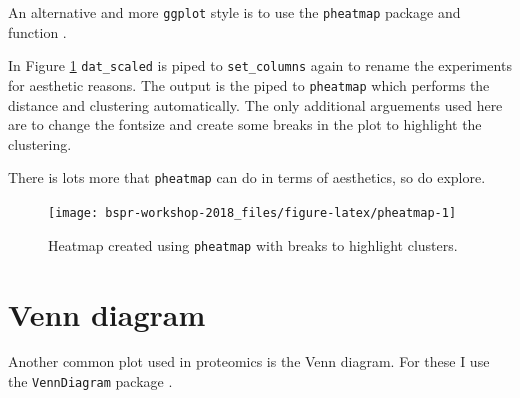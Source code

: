 \documentclass[12pt,]{book}
\newenvironment{Shaded}{\begin{snugshade}}{\end{snugshade}}
\newcommand{\CommentTok}[1]{\textcolor[rgb]{0.56,0.35,0.01}{\textit{#1}}}
\newcommand{\DataTypeTok}[1]{\textcolor[rgb]{0.13,0.29,0.53}{#1}}
\newcommand{\DecValTok}[1]{\textcolor[rgb]{0.00,0.00,0.81}{#1}}
\newcommand{\KeywordTok}[1]{\textcolor[rgb]{0.13,0.29,0.53}{\textbf{#1}}}
\newcommand{\NormalTok}[1]{#1}
\newcommand{\OperatorTok}[1]{\textcolor[rgb]{0.81,0.36,0.00}{\textbf{#1}}}
\newcommand{\StringTok}[1]{\textcolor[rgb]{0.31,0.60,0.02}{#1}}
\begin{document}
An alternative and more \texttt{ggplot} style is to use the \texttt{pheatmap} package and
function \citep{R-pheatmap}.

In Figure \ref{fig:pheatmap} \texttt{dat\_scaled} is piped to \texttt{set\_columns} again to
rename the experiments for aesthetic reasons. The output is the piped to
\texttt{pheatmap} which performs the distance and clustering automatically. The only
additional arguements used here are to change the fontsize and create some
breaks in the plot to highlight the clustering.

There is lots more that \texttt{pheatmap} can do in terms of aesthetics, so do explore.



\begin{Shaded}
\end{Shaded}

\begin{figure}

{\centering \texttt{[image: bspr-workshop-2018\_files/figure-latex/pheatmap-1]} 

}

\caption{Heatmap created using \texttt{pheatmap} with breaks to highlight clusters.}\label{fig:pheatmap}
\end{figure}

\hypertarget{venn}{%
\section{Venn diagram}\label{venn}}

Another common plot used in proteomics is the Venn diagram. For these I use
the \texttt{VennDiagram} package \citep{R-VennDiagram}.
\end{document}
